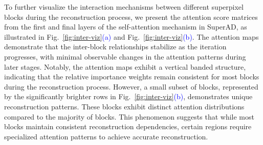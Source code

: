 To further visualize the interaction mechanisms between different superpixel blocks during the reconstruction process, we present the attention score matrices from the first and final layers of the self-attention mechanism in SuperAD, as illustrated in Fig.~\ref{fig:inter-viz}\textcolor{blue}{(a)} and Fig.~\ref{fig:inter-viz}\textcolor{blue}{(b)}. The attention maps demonstrate that the inter-block relationships stabilize as the iteration progresses, with minimal observable changes in the attention patterns during later stages. Notably, the attention maps exhibit a vertical banded structure, indicating that the relative importance weights remain consistent for most blocks during the reconstruction process. However, a small subset of blocks, represented by the significantly brighter rows in Fig.~\ref{fig:inter-viz}\textcolor{blue}{(b)}, demonstrates unique reconstruction patterns. These blocks exhibit distinct attention distributions compared to the majority of blocks. This phenomenon suggests that while most blocks maintain consistent reconstruction dependencies, certain regions require specialized attention patterns to achieve accurate reconstruction. 


